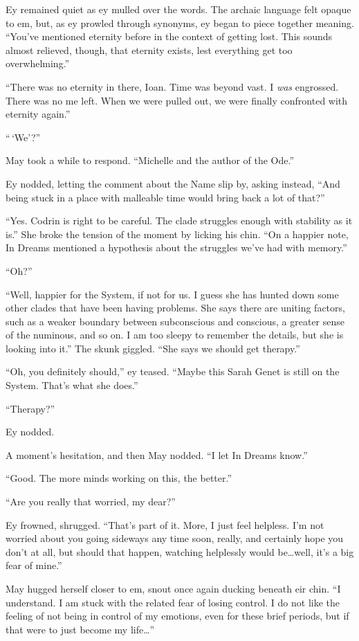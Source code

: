 Ey remained quiet as ey mulled over the words. The archaic language felt opaque to em, but, as ey prowled through synonyms, ey began to piece together meaning. ``You've mentioned eternity before in the context of getting lost. This sounds almost relieved, though, that eternity exists, lest everything get too overwhelming.''

``There was no eternity in there, Ioan. Time was beyond vast. I \emph{was} engrossed. There was no me left. When we were pulled out, we were finally confronted with eternity again.''

``\,`We'?''

May took a while to respond. ``Michelle and the author of the Ode.''

Ey nodded, letting the comment about the Name slip by, asking instead, ``And being stuck in a place with malleable time would bring back a lot of that?''

``Yes. Codrin is right to be careful. The clade struggles enough with stability as it is.'' She broke the tension of the moment by licking his chin. ``On a happier note, In Dreams mentioned a hypothesis about the struggles we've had with memory.''

``Oh?''

``Well, happier for the System, if not for us. I guess she has hunted down some other clades that have been having problems. She says there are uniting factors, such as a weaker boundary between subconscious and conscious, a greater sense of the numinous, and so on. I am too sleepy to remember the details, but she is looking into it.'' The skunk giggled. ``She says we should get therapy.''

``Oh, you definitely should,'' ey teased. ``Maybe this Sarah Genet is still on the System. That's what she does.''

``Therapy?''

Ey nodded.

A moment's hesitation, and then May nodded. ``I let In Dreams know.''

``Good. The more minds working on this, the better.''

``Are you really that worried, my dear?''

Ey frowned, shrugged. ``That's part of it. More, I just feel helpless. I'm not worried about you going sideways any time soon, really, and certainly hope you don't at all, but should that happen, watching helplessly would be\ldots well, it's a big fear of mine.''

May hugged herself closer to em, snout once again ducking beneath eir chin. ``I understand. I am stuck with the related fear of losing control. I do not like the feeling of not being in control of my emotions, even for these brief periods, but if that were to just become my life\ldots{}''


